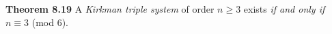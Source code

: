 \nopagenumbers
{\bf Theorem 8.19}
\vskip 6pt
A {\it Kirkman triple system} of order $n \geq 3$ exists {\it if and only if} $n \equiv 3$ (mod $6$).

\vfill\eject
